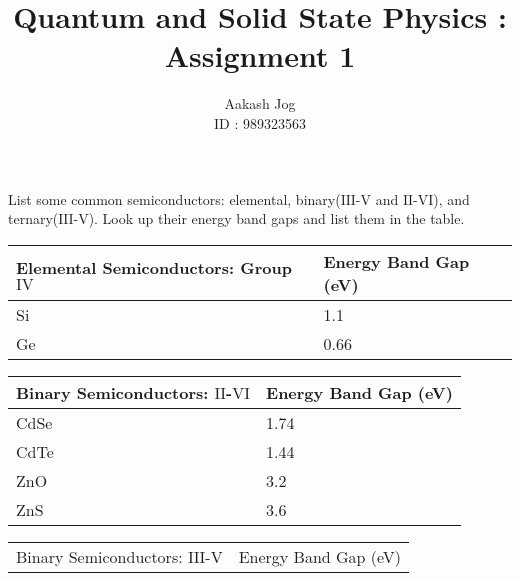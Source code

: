 \documentclass[fleqn, a4paper, 11pt, oneside]{amsart}
\title{Quantum and Solid State Physics : Assignment 1}
\author
{
	Aakash Jog\\
	ID : 989323563
}
\date{\formatdate{22}{10}{2015}}
\theoremstyle{definition}
\theoremstyle{theorem}
\begin{document}

\maketitle

\begin{question}
	List some common semiconductors: elemental, binary($\mathrm{III}$-$\mathrm{V}$ and $\mathrm{II}$-$\mathrm{VI}$), and ternary($\mathrm{III}$-$\mathrm{V}$).
	Look up their energy band gaps and list them in the table.
\end{question}

\begin{solution}
	\begin{table}[H]
		\begin{tabular}{|l|l|}
			\hline
			Elemental Semiconductors: Group $\mathrm{IV}$ & Energy Band Gap (\si{\electronvolt}) \\
			\hline
			Si                                            & 1.1                                  \\
			Ge                                            & 0.66                                 \\
			\hline
		\end{tabular}
	\end{table}
	\begin{table}[H]
		\begin{tabular}{|l|l|}
			\hline
			Binary Semiconductors: $\mathrm{II}$-$\mathrm{VI}$ & Energy Band Gap (\si{\electronvolt}) \\
			\hline
			CdSe                                               & 1.74                                 \\
			CdTe                                               & 1.44                                 \\
			ZnO                                                & 3.2                                  \\
			ZnS                                                & 3.6                                  \\
			\hline
		\end{tabular}
	\end{table}
	\begin{table}[H]
		\begin{tabular}{|l|l|}
			\hline
			Binary Semiconductors: $\mathrm{III}$-$\mathrm{V}$ & Energy Band Gap (\si{\electronvolt}) \\

\end{tabular}
\end{table}
\end{solution}
\end{document}
